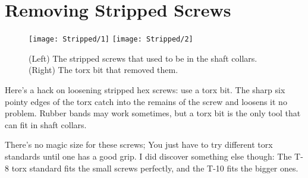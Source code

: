 \section{Removing Stripped Screws}

\begin{figure}[h]
    \centering
    \texttt{[image: Stripped/1]}
    \texttt{[image: Stripped/2]}
    \caption{
        (Left) The stripped screws that used to be in the shaft collars. (Right) The torx bit that removed them.
    }
\end{figure}

Here's a hack on loosening stripped hex screws: use a torx bit. The sharp six pointy edges of the torx catch into the remains of the screw and loosens it no problem. Rubber bands may work sometimes, but a torx bit is the only tool that can fit in shaft collars. 

There's no magic size for these screws; You just have to try different torx standards until one has a good grip. I did discover something else though: The T-8 torx standard fits the small screws perfectly, and the T-10 fits the bigger ones.
